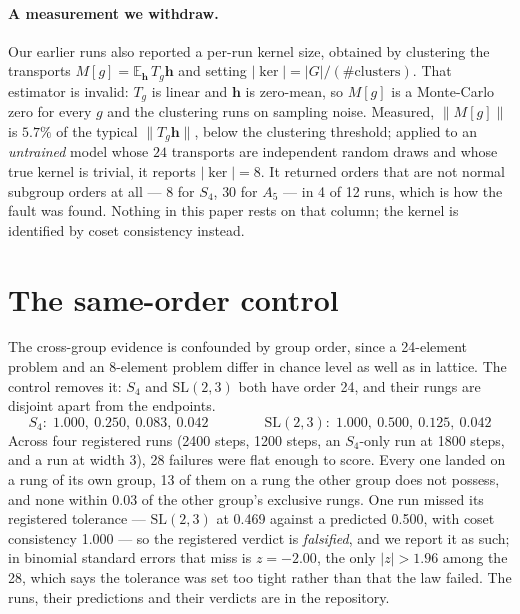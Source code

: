 \documentclass[10pt]{article}
\newcommand{\bh}{\mathbf{h}}
\begin{document}
\paragraph{A measurement we withdraw.} Our earlier runs also reported a per-run kernel size, obtained
by clustering the transports $M[g]=\mathbb{E}_\bh\,T_g\bh$ and setting $|\ker| = |G|/(\#\text{clusters})$.
That estimator is invalid: $T_g$ is linear and $\bh$ is zero-mean, so $M[g]$ is a Monte-Carlo zero for
every $g$ and the clustering runs on sampling noise. Measured, $\|M[g]\|$ is $5.7\%$ of the typical
$\|T_g\bh\|$, below the clustering threshold; applied to an \emph{untrained} model whose $24$
transports are independent random draws and whose true kernel is trivial, it reports $|\ker|=8$. It
returned orders that are not normal subgroup orders at all --- $8$ for $S_4$, $30$ for $A_5$ --- in 4
of 12 runs, which is how the fault was found. Nothing in this paper rests on that column; the kernel
is identified by coset consistency instead.

\section{The same-order control}
\label{sec:control}

The cross-group evidence is confounded by group order, since a 24-element problem and an 8-element
problem differ in chance level as well as in lattice. The control removes it: $S_4$ and $\mathrm{SL}(2,3)$
both have order 24, and their rungs are disjoint apart from the endpoints.
\[
  S_4:\; 1.000,\ 0.250,\ 0.083,\ 0.042 \qquad\qquad \mathrm{SL}(2,3):\; 1.000,\ 0.500,\ 0.125,\ 0.042
\]
Across four registered runs (2400 steps, 1200 steps, an $S_4$-only run at 1800 steps, and a run at
width 3), 28 failures were flat enough to score. Every one landed on a rung of its own group, 13 of
them on a rung the other group does not possess, and none within 0.03 of the other group's exclusive
rungs. One run missed its registered tolerance --- $\mathrm{SL}(2,3)$ at 0.469 against a predicted
0.500, with coset consistency 1.000 --- so the registered verdict is \emph{falsified}, and we report it
as such; in binomial standard errors that miss is $z=-2.00$, the only $|z|>1.96$ among the 28, which
says the tolerance was set too tight rather than that the law failed. The runs, their predictions and
their verdicts are in the repository.

\end{document}
